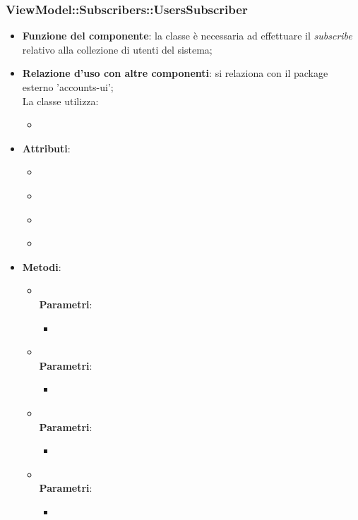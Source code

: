 \subsubsection{ViewModel::Subscribers::UsersSubscriber}
\begin{itemize}
\item\textbf{Funzione del componente}: la classe è necessaria ad effettuare il \emph{subscribe} relativo alla collezione di utenti del sistema;
	\item\textbf{Relazione d'uso con altre componenti}: si relaziona con il package esterno 'accounts-ui';\\ 
La classe utilizza:
	\begin{itemize}
		\item
	\end{itemize}
\item\textbf{Attributi}:
	\begin{itemize}
		\item\code{}\\
		\item\code{}\\
		\item\code{}\\
		\item\code{}\\
	\end{itemize}
\item\textbf{Metodi}:
	\begin{itemize}
		\item\code{}\\
		\textbf{Parametri}:
			\begin{itemize}
				\item\code{}\\
			\end{itemize}
		\item\code{}\\
		\textbf{Parametri}:
			\begin{itemize}
				\item\code{}\\
			\end{itemize}
		\item\code{}\\
		\textbf{Parametri}:
			\begin{itemize}
				\item\code{}\\
			\end{itemize}
		\item\code{}\\
		\textbf{Parametri}:
			\begin{itemize}
				\item\code{}\\
			\end{itemize}
	\end{itemize}
\end{itemize}


